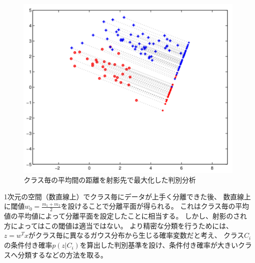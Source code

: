 \begin{figure}
    \centering
    \includegraphics[width=12cm]{images/var_dis.png}
    \caption{クラス毎の平均間の距離を射影先で最大化した判別分析}
    \label{fig:var_dis}
\end{figure}

1次元の空間（数直線上）でクラス毎にデータが上手く分離できた後、
数直線上に閾値\(w_0=\frac{m_1+m_2}{2}\)を設けることで分離平面が得られる。
これはクラス毎の平均値の平均値によって分離平面を設定したことに相当する。
しかし、射影のされ方によってはこの閾値は適当ではない。
より精密な分類を行うためには、\(z=w^Tx\)がクラス毎に異なるガウス分布から生じる確率変数だと考え、
クラス\(C_i\)の条件付き確率\(p(z|C_i)\)を算出した判別基準を設け、条件付き確率が大きいクラスへ分類するなどの方法を取る。


